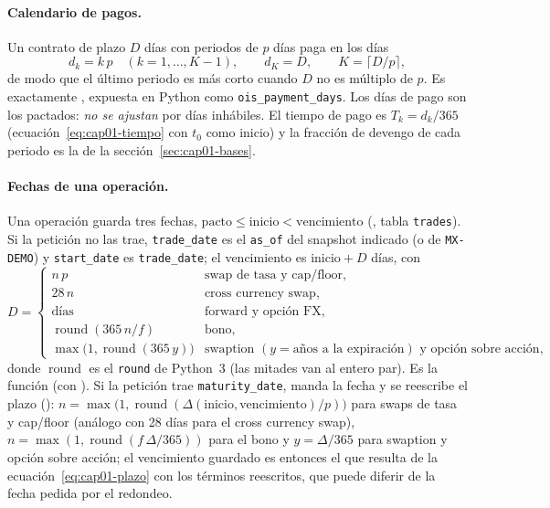 \begin{sloppypar}
\paragraph{Calendario de pagos.} Un contrato de plazo $D$ días con periodos de $p$ días paga en los días
\begin{equation}\label{eq:cap01-pagos}
  d_k = k\,p \quad (k=1,\dots,K-1), \qquad d_K = D, \qquad K=\lceil D/p\rceil ,
\end{equation}
de modo que el último periodo es más corto cuando $D$ no es múltiplo de $p$. Es exactamente
, expuesta en Python como
\texttt{ois\_payment\_days}. Los días de pago son los pactados: \emph{no se ajustan} por días inhábiles.
El tiempo de pago es $T_k=d_k/365$ (ecuación~\eqref{eq:cap01-tiempo} con $t_0$ como inicio) y la fracción de
devengo de cada periodo es la de la sección~\ref{sec:cap01-bases}.

\paragraph{Fechas de una operación.} Una operación guarda tres fechas, $\text{pacto}\le\text{inicio}<\text{vencimiento}$
(, tabla \texttt{trades}). Si la petición no las trae,
\texttt{trade\_date} es el \texttt{as\_of} del snapshot indicado (o de \texttt{MX-DEMO}) y
\texttt{start\_date} es \texttt{trade\_date}; el vencimiento es
$\text{inicio}+D$ días, con
\begin{equation}\label{eq:cap01-plazo}
  D=\begin{cases}
    n\,p & \text{swap de tasa y cap/floor},\\
    28\,n & \text{cross currency swap},\\
    \text{días} & \text{forward y opción FX},\\
    \operatorname{round}(365\,n/f) & \text{bono},\\
    \max\bigl(1,\operatorname{round}(365\,y)\bigr) & \text{swaption } (y=\text{años a la expiración}) \text{ y opción sobre acción},
  \end{cases}
\end{equation}
donde $\operatorname{round}$ es el \texttt{round} de Python~3 (las mitades van al entero par). Es la función
 (con ). Si la
petición trae \texttt{maturity\_date}, manda la fecha y se reescribe el plazo
(): $n=\max\bigl(1,\operatorname{round}(\Delta(\text{inicio},\text{vencimiento})/p)\bigr)$
para swaps de tasa y cap/floor (análogo con 28 días para el cross currency swap),
$n=\max(1,\operatorname{round}(f\,\Delta/365))$ para el bono y $y=\Delta/365$ para swaption y opción sobre
acción; el vencimiento guardado es entonces el que resulta de la ecuación~\eqref{eq:cap01-plazo} con los
términos reescritos, que puede diferir de la fecha pedida por el redondeo.


\end{sloppypar}
